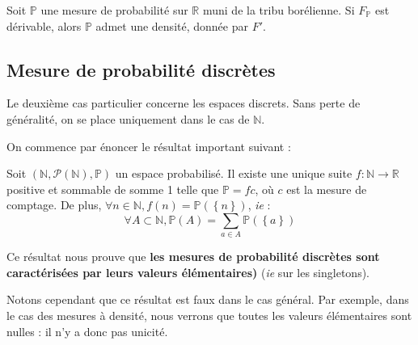 \documentclass[../integ-proba.tex]{subfiles}
\begin{document}
    \begin{prop}
        Soit $\mathbb{P}$ une mesure de probabilité sur $\mathbb{R}$ muni de la tribu borélienne.
        Si $F_\mathbb{P}$ est dérivable, alors $\mathbb{P}$ admet une densité, donnée par $F'$.
    \end{prop}



    \subsection{Mesure de probabilité discrètes}
    Le deuxième cas particulier concerne les espaces discrets.
    Sans perte de généralité, on se place uniquement dans le cas de $\mathbb{N}$.

    On commence par énoncer le résultat important suivant :

    \begin{thm}
        Soit $\left(\mathbb{N}, \mathcal{P}(\mathbb{N}), \mathbb{P} \right)$ un espace probabilisé.
        Il existe une unique suite $f:\mathbb{N} \rightarrow \mathbb{R}$ positive et sommable de somme 1 telle que $\mathbb{P} = f c$, où $c$ est la mesure de comptage.
        De plus, $\forall n \in \mathbb{N}, f(n)=\mathbb{P}(\left\{n\right\})$, \textit{ie} :
        \begin{displaymath}
            \forall A \subset \mathbb{N}, \mathbb{P}(A) = \sum_{a \in A} \mathbb{P}(\left\{ a \right\})
        \end{displaymath}
    \end{thm}

    \begin{rem}
        Ce résultat nous prouve que \textbf{les mesures de probabilité discrètes sont caractérisées par leurs valeurs élémentaires)} (\textit{ie} sur les singletons).

        Notons cependant que ce résultat est faux dans le cas général.
        Par exemple, dans le cas des mesures à densité, nous verrons que toutes les valeurs élémentaires sont nulles : il n'y a donc pas unicité.
    \end{rem}

\end{document}
